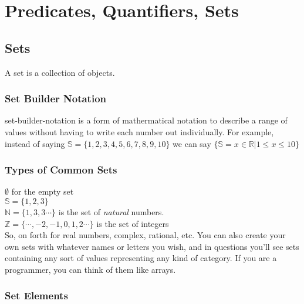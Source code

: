\section{Predicates, Quantifiers, Sets}
\subsection{Sets}

A \gls{set} is a collection of objects. 
\subsubsection{Set Builder Notation}
\gls{set-builder-notation} is a form of mathermatical notation to describe a
range of values without having to write each number out individually. For
example, instead of saying $\mathbb{S} = \{1, 2, 3, 4, 5, 6, 7, 8, 9, 10 \}$ we
can say $\{\mathbb{S} = { x \in \mathbb{R} | 1 \leq x \leq 10}\}$

\subsubsection{Types of Common Sets}
$ \emptyset $ for the empty set\\
$ \mathbb{S} = \{1, 2, 3\}$\\  
$ \mathbb{N} = \{ 1,3,3\cdots\}$  is the set of \textit{natural} numbers. \\
$ \mathbb{Z} = \{\cdots, -2, -1, 0, 1, 2 \cdots\} $ is the set of integers \\
\newline So, on forth  for real numbers, complex, rational, etc. You can also
create your own sets with whatever names or letters you wish, and in questions
you'll see sets containing any sort of values representing any kind of
category. If you are a programmer, you can think of them like arrays.

\subsubsection{Set Elements}

